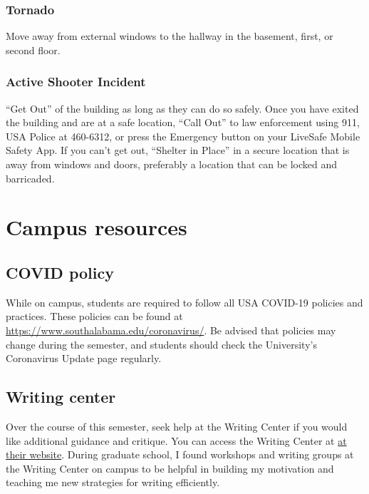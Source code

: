 \documentclass[11pt,]{article}
\begin{document}
\hypertarget{tornado}{%
\subsubsection{Tornado}\label{tornado}}

Move away from external windows to the hallway in the basement, first,
or second floor.

\hypertarget{active-shooter-incident}{%
\subsubsection{Active Shooter Incident}\label{active-shooter-incident}}

``Get Out'' of the building as long as they can do so safely. Once you
have exited the building and are at a safe location, ``Call Out'' to law
enforcement using 911, USA Police at 460-6312, or press the Emergency
button on your LiveSafe Mobile Safety App. If you can't get out,
``Shelter in Place'' in a secure location that is away from windows and
doors, preferably a location that can be locked and barricaded.

\hypertarget{campus-resources}{%
\section{Campus resources}\label{campus-resources}}

\hypertarget{covid-policy}{%
\subsection{COVID policy}\label{covid-policy}}

While on campus, students are required to follow all USA COVID-19
policies and practices. These policies can be found at
\url{https://www.southalabama.edu/coronavirus/}. Be advised that
policies may change during the semester, and students should check the
University's Coronavirus Update page regularly.

\hypertarget{writing-center}{%
\subsection{Writing center}\label{writing-center}}

Over the course of this semester, seek help at the Writing Center if you
would like additional guidance and critique. You can access the Writing
Center at
\href{https://www.southalabama.edu/departments/academicsuccess/cae/how.it.works.html}{at
their website}. During graduate school, I found workshops and writing
groups at the Writing Center on campus to be helpful in building my
motivation and teaching me new strategies for writing efficiently.
\end{document}
